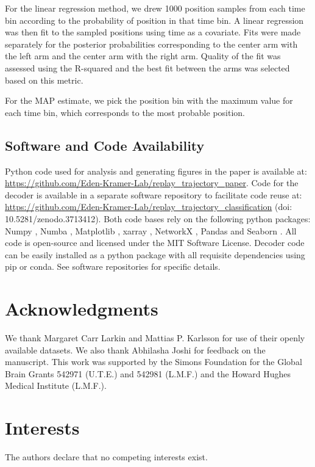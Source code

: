 \documentclass[9pt,lineno]{elife}
\begin{document}
For the linear regression method, we drew 1000 position samples from each time bin according to the probability of position in that time bin. A linear regression was then fit to the sampled positions using time as a covariate. Fits were made separately for the posterior probabilities corresponding to the center arm with the left arm and the center arm with the right arm. Quality of the fit was assessed using the R-squared and the best fit between the arms was selected based on this metric.

For the MAP estimate, we pick the position bin with the maximum value for each time bin, which corresponds to the most probable position.

\subsection*{Software and Code Availability}
Python code used for analysis and generating figures in the paper is available at: \url{https://github.com/Eden-Kramer-Lab/replay_trajectory_paper}. Code for the decoder is available in a separate software repository to facilitate code reuse at: \url{https://github.com/Eden-Kramer-Lab/replay_trajectory_classification} (doi: 10.5281/zenodo.3713412).
Both code bases rely on the following python packages: Numpy \citep{vanderWaltNumPyArrayStructure2011}, Numba \citep{LamNumbaLLVMbasedPython2015}, Matplotlib \citep{HunterMatplotlib2DGraphics2007}, xarray \citep{HoyerxarrayNDlabeled2017}, NetworkX \citep{HagbergExploringNetworkStructure2008}, Pandas \citep{McKinneyDataStructuresStatistical2010} and Seaborn \citep{Waskomseabornstatisticaldata2021}. All code is open-source and licensed under the MIT Software License. Decoder code can be easily installed as a python package with all requisite dependencies using pip or conda. See software repositories for specific details.

\section{Acknowledgments}
We thank Margaret Carr Larkin and Mattias P. Karlsson for use of their openly available datasets. We also thank Abhilasha Joshi for feedback on the manuscript. This work was supported by the Simons Foundation for the Global Brain Grants 542971 (U.T.E.) and 542981 (L.M.F.) and the Howard Hughes Medical Institute (L.M.F.).

\section{Interests}
The authors declare that no competing interests exist.


\end{document}
